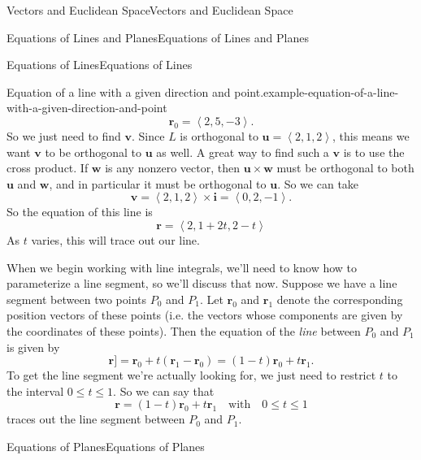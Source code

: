 \documentclass[10pt,]{book}
\numberwithin{equation}{section}
\newcommand{\vv}[1]{\mathbf{#1}}
\newcommand{\dotprod}[1]{\left\langle #1 \right\rangle}
\begin{document}
\begin{chapterptx}{Vectors and Euclidean Space}{}{Vectors and Euclidean Space}{}{}
\begin{sectionptx}{Equations of Lines and Planes}{}{Equations of Lines and Planes}{}{}
\begin{subsectionptx}{Equations of Lines}{}{Equations of Lines}{}{}
\begin{example}{Equation of a line with a given direction and point.}{example-equation-of-a-line-with-a-given-direction-and-point}
%
\begin{equation*}
\vv{r}_{0} = \dotprod{2,5,-3}.
\end{equation*}
\hypertarget{p-992}{}%
So we just need to find \(\vv{v}\). Since \(L\) is orthogonal to \(\vv{u} = \dotprod{2,1,2}\), this means we want \(\vv{v}\) to be orthogonal to \(\vv{u}\) as well. A great way to find such a \(\vv{v}\) is to use the cross product. If \(\vv{w}\) is any nonzero vector, then \(\vv{u}\times\vv{w}\) must be orthogonal to both \(\vv{u}\) and \(\vv{w}\), and in particular it must be orthogonal to \(\vv{u}\). So we can take%
%
\begin{equation*}
\vv{v} = \dotprod{2,1,2}\times\vv{i} = \dotprod{0,2,-1}.
\end{equation*}
\hypertarget{p-993}{}%
So the equation of this line is%
%
\begin{equation*}
\vv{r} = \dotprod{2,1+2t,2-t}
\end{equation*}
\hypertarget{p-994}{}%
As \(t\) varies, this will trace out our line.%
\end{example}
\hypertarget{p-995}{}%
When we begin working with line integrals, we'll need to know how to parameterize a line segment, so we'll discuss that now. Suppose we have a line segment between two points \(P_{0}\) and \(P_{1}\). Let \(\vv{r}_{0}\) and \(\vv{r}_{1}\) denote the corresponding position vectors of these points (i.e. the vectors whose components are given by the coordinates of these points). Then the equation of the \emph{line} between \(P_{0}\) and \(P_{1}\) is given by%
%
\begin{equation*}
\vv{r}] = \vv{r}_{0}+t(\vv{r}_{1}-\vv{r}_{0}) = (1-t)\vv{r}_{0}+t\vv{r}_{1}.
\end{equation*}
\hypertarget{p-996}{}%
To get the line segment we're actually looking for, we just need to restrict \(t\) to the interval \(0\leq t\leq 1\). So we can say that%
%
\begin{equation*}
\vv{r} = (1-t)\vv{r}_{0}+t\vv{r}_{1} \quad\text{with}\quad0\leq t\leq 1
\end{equation*}
\hypertarget{p-997}{}%
traces out the line segment between \(P_{0}\) and \(P_{1}\).%
\end{subsectionptx}
%
%
\typeout{************************************************}
\typeout{************************************************}
%
\begin{subsectionptx}{Equations of Planes}{}{Equations of Planes}{}{}\label{subsection-equations-of-planes}
\hypertarget{p-998}{}%

\end{subsectionptx}
\end{sectionptx}
\end{chapterptx}
\end{document}
